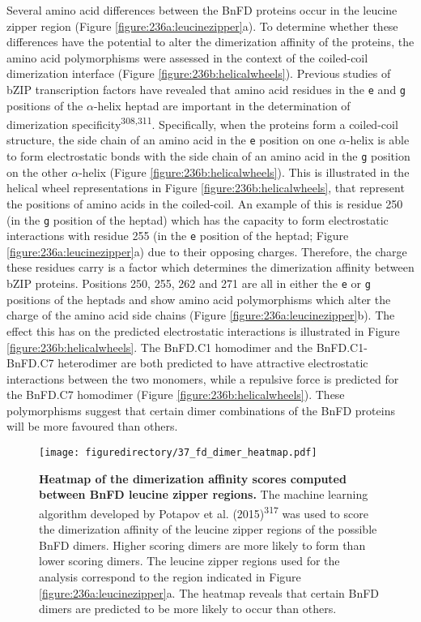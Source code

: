 \documentclass[12pt,]{book}
\begin{document}
Several amino acid differences between the BnFD proteins occur in the
leucine zipper region (Figure \ref{figure:236a:leucinezipper}a). To
determine whether these differences have the potential to alter the
dimerization affinity of the proteins, the amino acid polymorphisms were
assessed in the context of the coiled-coil dimerization interface
(Figure \ref{figure:236b:helicalwheels}). Previous studies of bZIP
transcription factors have revealed that amino acid residues in the
\texttt{e} and \texttt{g} positions of the \(\alpha\)-helix heptad are
important in the determination of dimerization
specificity\textsuperscript{308,311}. Specifically, when the proteins
form a coiled-coil structure, the side chain of an amino acid in the
\texttt{e} position on one \(\alpha\)-helix is able to form
electrostatic bonds with the side chain of an amino acid in the
\texttt{g} position on the other \(\alpha\)-helix (Figure
\ref{figure:236b:helicalwheels}). This is illustrated in the helical
wheel representations in Figure \ref{figure:236b:helicalwheels}, that
represent the positions of amino acids in the coiled-coil. An example of
this is residue 250 (in the \texttt{g} position of the heptad) which has
the capacity to form electrostatic interactions with residue 255 (in the
\texttt{e} position of the heptad; Figure
\ref{figure:236a:leucinezipper}a) due to their opposing charges.
Therefore, the charge these residues carry is a factor which determines
the dimerization affinity between bZIP proteins. Positions 250, 255, 262
and 271 are all in either the \texttt{e} or \texttt{g} positions of the
heptads and show amino acid polymorphisms which alter the charge of the
amino acid side chains (Figure \ref{figure:236a:leucinezipper}b). The
effect this has on the predicted electrostatic interactions is
illustrated in Figure \ref{figure:236b:helicalwheels}. The BnFD.C1
homodimer and the BnFD.C1-BnFD.C7 heterodimer are both predicted to have
attractive electrostatic interactions between the two monomers, while a
repulsive force is predicted for the BnFD.C7 homodimer (Figure
\ref{figure:236b:helicalwheels}). These polymorphisms suggest that
certain dimer combinations of the BnFD proteins will be more favoured
than others.

\begin{figure}[htbp]
\centering
\texttt{[image: figuredirectory/37\_fd\_dimer\_heatmap.pdf]}
\caption{\textbf{Heatmap of the dimerization affinity scores computed
between BnFD leucine zipper regions.} The machine learning algorithm
developed by Potapov et al. (2015)\textsuperscript{317} was used to
score the dimerization affinity of the leucine zipper regions of the
possible BnFD dimers. Higher scoring dimers are more likely to form than
lower scoring dimers. The leucine zipper regions used for the analysis
correspond to the region indicated in Figure
\ref{figure:236a:leucinezipper}a. The heatmap reveals that certain BnFD
dimers are predicted to be more likely to occur than
others.}\label{figure:237:bnafdheatmap}
\end{figure}
\end{document}
